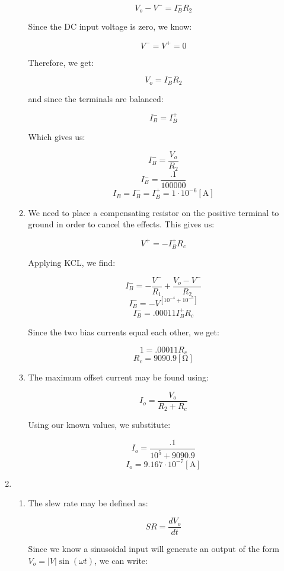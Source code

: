 \begin{enumerate}
\begin{enumerate}
        $$V_o-V^-=I_B^-R_2$$

        Since the DC input voltage is zero, we know:

        $$V^-=V^+=0$$

        Therefore, we get:

        $$V_o=I_B^-R_2$$

        and since the terminals are balanced:

        $$I_B^-=I_B^+$$

        Which gives us:

        $$I_B^-=\frac{V_o}{R_2}$$
        $$I_B^-=\frac{.1}{100000}$$
        $$\boxed{I_B=I_B^-=I_B^+=1\cdot10^{-6}[\si{\ampere}]}$$

      \item 

        We need to place a compensating resistor on the positive terminal to ground in order to cancel the effects. This gives us:

        $$V^{+}=-I_B^{+}R_c$$

        Applying KCL, we find:

        $$I_B^{-}=-\frac{V^-}{R_1}+\frac{V_o-V^-}{R_2}$$
        $$I_B^{-}=-V^\left[ 10^{-4}+10^{-5} \right]$$
        $$I_B^{-}=.00011I_B^+R_c$$

        Since the two bias currents equal each other, we get:

        $$1=.00011R_c$$
        $$\boxed{R_c=9090.9[\si{\ohm}]}$$

      \item 

        The maximum offset current may be found using:

        $$I_o=\frac{V_o}{R_2+R_c}$$

        Using our known values, we substitute:

        $$I_o=\frac{.1}{10^5+9090.9}$$
        $$\boxed{I_o=9.167\cdot10^{-7}[\si{\ampere}]}$$

    \end{enumerate}

  \item

    \begin{enumerate}

      \item 

        The slew rate may be defined as:

        $$SR=\frac{dV_o}{dt}$$

        Since we know a sinusoidal input will generate an output of the form $V_o=|V|\sin(\omega t)$, we can write:


\end{enumerate}
\end{enumerate}
